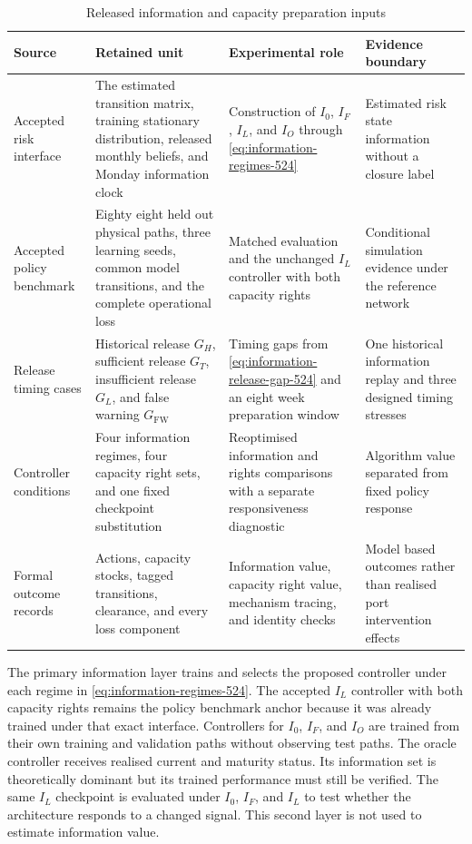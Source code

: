 \documentclass[a4paper,fleqn]{cas-sc}
\begin{document}
\begingroup
\setlength{\tabcolsep}{4pt}
\begin{table}[t]
\centering
\caption{Released information and capacity preparation inputs}
\label{tab:524-information-inputs}
\begin{tabular}{>{\RaggedRight\arraybackslash}p{}
                >{\RaggedRight\arraybackslash}p{}
                >{\RaggedRight\arraybackslash}p{}
                >{\RaggedRight\arraybackslash}p{}}
\toprule
Source & Retained unit & Experimental role & Evidence boundary \\
\midrule
Accepted risk interface
& The estimated transition matrix, training stationary distribution, released monthly beliefs, and Monday information clock
& Construction of $I_0$, $I_F$, $I_L$, and $I_O$ through \cref{eq:information-regimes-524}
& Estimated risk state information without a closure label \\
Accepted policy benchmark
& Eighty eight held out physical paths, three learning seeds, common model transitions, and the complete operational loss
& Matched evaluation and the unchanged $I_L$ controller with both capacity rights
& Conditional simulation evidence under the reference network \\
Release timing cases
& Historical release $G_H$, sufficient release $G_T$, insufficient release $G_L$, and false warning $G_{\mathrm{FW}}$
& Timing gaps from \cref{eq:information-release-gap-524} and an eight week preparation window
& One historical information replay and three designed timing stresses \\
Controller conditions
& Four information regimes, four capacity right sets, and one fixed checkpoint substitution
& Reoptimised information and rights comparisons with a separate responsiveness diagnostic
& Algorithm value separated from fixed policy response \\
Formal outcome records
& Actions, capacity stocks, tagged transitions, clearance, and every loss component
& Information value, capacity right value, mechanism tracing, and identity checks
& Model based outcomes rather than realised port intervention effects \\
\bottomrule
\end{tabular}
\end{table}
\endgroup

The primary information layer trains and selects the proposed controller under
each regime in \cref{eq:information-regimes-524}. The accepted $I_L$ controller
with both capacity rights remains the policy benchmark anchor because it was
already trained under that exact interface. Controllers for $I_0$, $I_F$, and
$I_O$ are trained from their own training and validation paths without observing
test paths. The oracle controller receives realised current and maturity status.
Its information set is theoretically dominant but its trained performance must
still be verified. The same $I_L$ checkpoint is evaluated under $I_0$, $I_F$,
and $I_L$ to test whether the architecture responds to a changed signal. This
second layer is not used to estimate information value.
\end{document}
